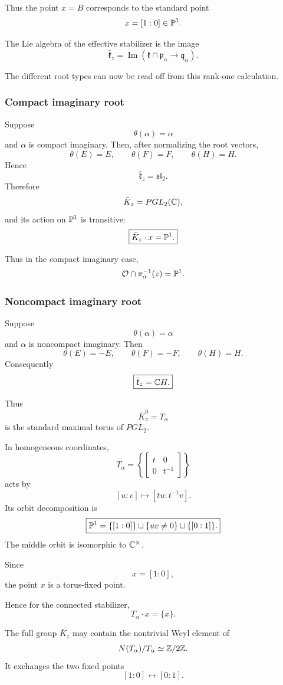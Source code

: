 Thus the point $x=B$ corresponds to the standard point
\[
x=[1:0]\in \mathbb{P}^1.
\]

The Lie algebra of the effective stabilizer is the image
\[
\bar{\mathfrak k}_z
=
\operatorname{Im}
\left(
\mathfrak k\cap\mathfrak p_\alpha
\longrightarrow
\mathfrak q_\alpha
\right).
\]

The different root types can now be read off from this rank-one
calculation.

\subsubsection*{Compact imaginary root}

Suppose
\[
\theta(\alpha)=\alpha
\]
and $\alpha$ is compact imaginary. Then, after normalizing the root
vectors,
\[
\theta(E)=E,\qquad
\theta(F)=F,\qquad
\theta(H)=H.
\]
Hence
\[
\bar{\mathfrak k}_z
=
\mathfrak{sl}_2.
\]
Therefore
\[
\bar K_z=PGL_2(\mathbb{C}),
\]
and its action on $\mathbb{P}^1$ is transitive:
\[
\boxed{
\bar K_z\cdot x=\mathbb{P}^1.
}
\]

Thus in the compact imaginary case,
\[
\mathcal{O}\cap\pi_\alpha^{-1}(z)=\mathbb{P}^1.
\]

\subsubsection*{Noncompact imaginary root}

Suppose
\[
\theta(\alpha)=\alpha
\]
and $\alpha$ is noncompact imaginary. Then
\[
\theta(E)=-E,\qquad
\theta(F)=-F,\qquad
\theta(H)=H.
\]
Consequently
\[
\boxed{
\bar{\mathfrak k}_z
=
\mathbb{C} H.
}
\]

Thus
\[
\bar K_z^0=T_\alpha
\]
is the standard maximal torus of $PGL_2$.

In homogeneous coordinates,
\[
T_\alpha
=
\left\{
\begin{bmatrix}
t&0\\
0&t^{-1}
\end{bmatrix}
\right\}
\]
acts by
\[
[u:v]\longmapsto [tu:t^{-1}v].
\]
Its orbit decomposition is
\[
\boxed{
\mathbb{P}^1
=
\{[1:0]\}
\sqcup
\{uv\neq0\}
\sqcup
\{[0:1]\}.
}
\]
The middle orbit is isomorphic to $\mathbb{C}^\times$.

Since
\[
x=[1:0],
\]
the point $x$ is a torus-fixed point.

Hence for the connected stabilizer,
\[
T_\alpha\cdot x=\{x\}.
\]

The full group $\bar K_z$ may contain the nontrivial Weyl element of
\[
N(T_\alpha)/T_\alpha\simeq \mathbb{Z}/2\mathbb{Z}.
\]
It exchanges the two fixed points
\[
[1:0]\longleftrightarrow[0:1].
\]

